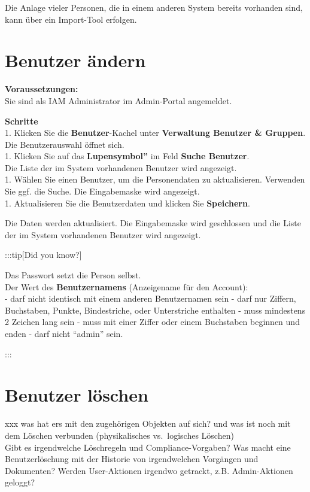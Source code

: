 \documentclass[
  letterpaper,
  DIV=11,
  numbers=noendperiod]{scrreprt}
\begin{document}
Die Anlage vieler Personen, die in einem anderen System bereits
vorhanden sind, kann über ein Import-Tool erfolgen.

\section{Benutzer ändern}\label{benutzer-uxe4ndern}

\textbf{Voraussetzungen:}\\
Sie sind als IAM Administrator im Admin-Portal angemeldet.

\textbf{Schritte}\\
1. Klicken Sie die \textbf{Benutzer}-Kachel unter \textbf{Verwaltung
Benutzer \& Gruppen}.\\
Die Benutzerauswahl öffnet sich.\\
1. Klicken Sie auf das \textbf{Lupensymbol''} im Feld \textbf{Suche
Benutzer}.\\
Die Liste der im System vorhandenen Benutzer wird angezeigt.\\
1. Wählen Sie einen Benutzer, um die Personendaten zu aktualisieren.
Verwenden Sie ggf. die Suche. Die Eingabemaske wird angezeigt.\\
1. Aktualisieren Sie die Benutzerdaten und klicken Sie
\textbf{Speichern}.

Die Daten werden aktualisiert. Die Eingabemaske wird geschlossen und die
Liste der im System vorhandenen Benutzer wird angezeigt.

:::tip{[}Did you know?{]}

Das Passwort setzt die Person selbst.\\
Der Wert des \textbf{Benutzernamens} (Anzeigename für den Account):\\
- darf nicht identisch mit einem anderen Benutzernamen sein - darf nur
Ziffern, Buchstaben, Punkte, Bindestriche, oder Unterstriche enthalten -
muss mindestens 2 Zeichen lang sein - muss mit einer Ziffer oder einem
Buchstaben beginnen und enden - darf nicht ``admin'' sein.

:::

\section{Benutzer löschen}\label{benutzer-luxf6schen}

xxx was hat ers mit den zugehörigen Objekten auf sich? und was ist noch
mit dem Löschen verbunden (physikalisches vs.~logisches Löschen)\\
Gibt es irgendwelche Löschregeln und Compliance-Vorgaben? Was macht eine
Benutzerlöschung mit der Historie von irgendwelchen Vorgängen und
Dokumenten? Werden User-Aktionen irgendwo getrackt, z.B. Admin-Aktionen
geloggt?
\end{document}
